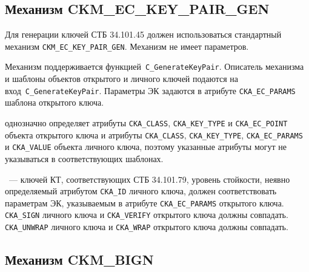 \subsection{Механизм CKM\_EC\_KEY\_PAIR\_GEN}\label{CRYPTOKI.Gen}


Для генерации ключей СТБ 34.101.45 должен использоваться стандартный 
механизм \verb|CKM_EC_KEY_PAIR_GEN|. Механизм не имеет параметров. 

Механизм поддерживается функцией~\verb|C_GenerateKeyPair|. 
%
Описатель механизма и шаблоны объектов открытого и личного
ключей подаются на вход~\verb|C_GenerateKeyPair|. Параметры ЭК задаются в 
атрибуте \verb|CKA_EC_PARAMS| шаблона открытого ключа.

 однозначно определяет атрибуты
\verb|CKA_CLASS|, \verb|CKA_KEY_TYPE| и \verb|CKA_EC_POINT|
объекта открытого ключа и атрибуты
\verb|CKA_CLASS|, \verb|CKA_KEY_TYPE|, \verb|CKA_EC_PARAMS| и 
\verb|CKA_VALUE| объекта личного ключа,
поэтому указанные атрибуты могут не указываться в
соответствующих шаблонах.

\begin{note}
~---
 ключей КТ, соответствующих СТБ 34.101.79,
уровень стойкости, неявно определяемый атрибутом \verb|CKA_ID| личного ключа,
должен соответствовать параметрам ЭК, указываемым в атрибуте 
\verb|CKA_EC_PARAMS| открытого ключа.  
\verb|CKA_SIGN| личного ключа и \verb|CKA_VERIFY| открытого ключа должны 
совпадать.  \verb|CKA_UNWRAP| личного ключа и 
\verb|CKA_WRAP| открытого ключа должны совпадать. 
\end{note}



\subsection{Механизм CKM\_BIGN}\label{CRYPTOKI.SignHSpec}

